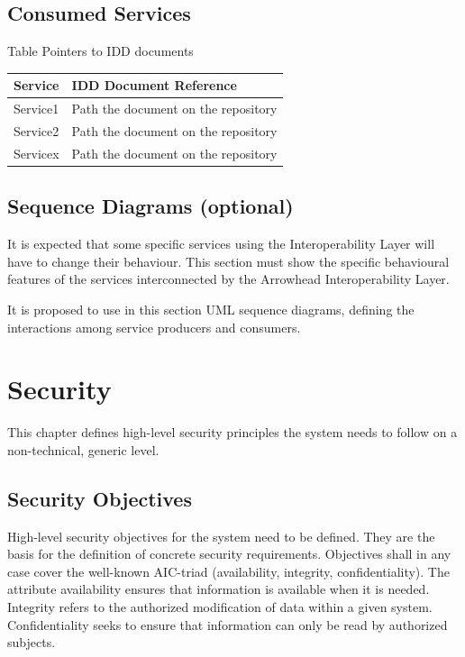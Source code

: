 \documentclass{article}
\newcounter{Table}
\renewcommand\theTable{\arabic{Table}}
\begin{document}
\subsection[Consumed Services]{Consumed Services}
Table \stepcounter{Table}{\theTable} Pointers to IDD documents

\begin{flushleft}
\tablefirsthead{}
\tablehead{}
\tabletail{}
\tablelasttail{}
\begin{supertabular}{|m{2.12756in}|m{3.80526in}|}
\hline
{ Service} &
{ IDD Document Reference}\\\hline
{ Service1} &
{ Path the document on the repository}\\\hline
{ Service2} &
{ Path the document on the repository}\\\hline
{ Servicex} &
{ Path the document on the repository}\\\hline
\end{supertabular}
\end{flushleft}
\subsection{Sequence Diagrams (optional)}
It is expected that some specific services using the Interoperability Layer will have to change their behaviour. This section must show the specific behavioural features of the services interconnected by the Arrowhead Interoperability Layer.

It is proposed to use in this section UML sequence diagrams, defining the interactions among service producers and consumers.

\section{Security }
This chapter defines high-level security principles the system needs to follow on a non-technical, generic level.

\subsection{Security Objectives}
High-level security objectives for the system need to be defined. They are the basis for the definition of concrete security requirements. Objectives shall in any case cover the well-known AIC-triad (availability, integrity, confidentiality). The attribute availability ensures that information is available when it is needed. Integrity refers to the authorized modification of data within a given system. Confidentiality seeks to ensure that information can only be read by authorized subjects. 
\end{document}
